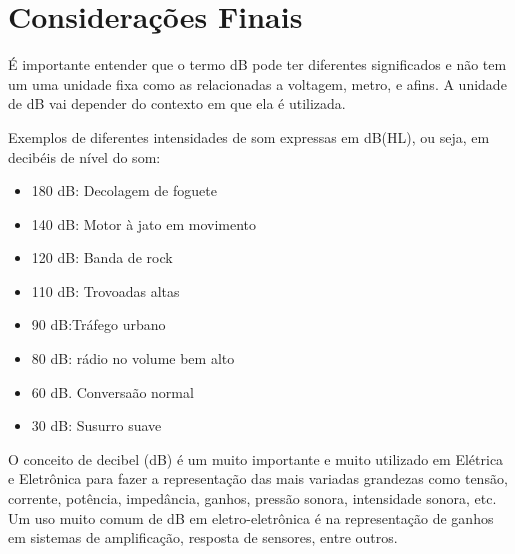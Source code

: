 \section{Considerações Finais}
   É importante entender que o termo dB pode ter diferentes significados e não tem um uma unidade fixa como as relacionadas a voltagem, metro, e afins. A unidade de dB vai depender do contexto em que ela é utilizada.

    Exemplos de diferentes intensidades de som expressas em dB(HL), ou seja, em decibéis de nível do som:
    
    \begin{itemize}
        \item 180 dB: Decolagem de foguete
        \item 140 dB: Motor à jato em movimento
        \item 120 dB: Banda de rock
        \item 110 dB: Trovoadas altas
        \item 90 dB:Tráfego urbano
        \item 80 dB: rádio no volume  bem alto
        \item 60 dB. Conversaão normal
        \item 30 dB: Susurro suave
    \end{itemize}
    
     O conceito de decibel (dB) é um muito importante e muito utilizado em Elétrica e Eletrônica para fazer a representação das mais variadas grandezas como tensão, corrente, potência, impedância, ganhos, pressão sonora, intensidade sonora, etc. Um uso muito comum de dB em eletro-eletrônica é na representação de ganhos em sistemas de amplificação, resposta de sensores, entre outros.
     